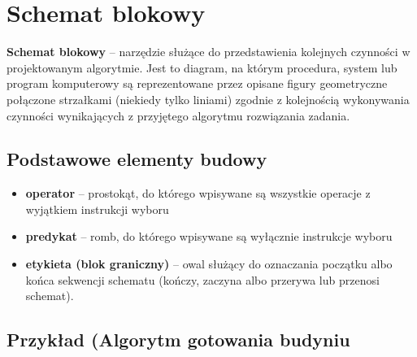 \documentclass[10pt,a4paper,onecolumn]{article}
\begin{document}
\newpage
\section{Schemat blokowy\cite{blokowy}}
\textbf{Schemat blokowy} – narzędzie służące do przedstawienia kolejnych czynności w projektowanym algorytmie. Jest to diagram, na którym procedura, system lub program komputerowy są reprezentowane przez opisane figury geometryczne połączone strzałkami (niekiedy tylko liniami) zgodnie z kolejnością wykonywania czynności wynikających z przyjętego algorytmu rozwiązania zadania. 
\subsection{Podstawowe elementy budowy}
\begin{itemize}
\item \textbf{operator} – prostokąt, do którego wpisywane są wszystkie operacje z wyjątkiem instrukcji wyboru
\item \textbf{predykat} – romb, do którego wpisywane są wyłącznie instrukcje wyboru
\item \textbf{etykieta (blok graniczny)} – owal służący do oznaczania początku albo końca sekwencji schematu (kończy, zaczyna albo przerywa lub przenosi schemat).
\end{itemize}

\subsection{Przykład (Algorytm gotowania budyniu\cite{budyn}}

\newpage
\end{document}
